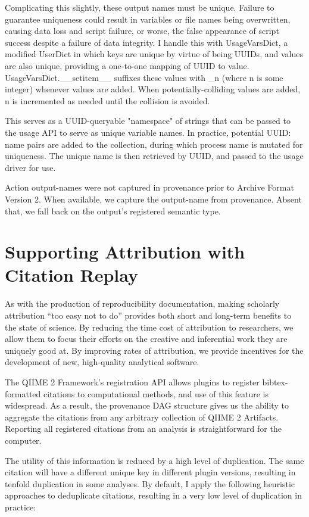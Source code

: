 Complicating this slightly, these output names must be unique. Failure to
guarantee uniqueness could result in variables or file names being overwritten,
causing data loss and script failure, or worse, the false appearance of script
success despite a failure of data integrity. I handle this with UsageVarsDict, a
modified UserDict in which keys are unique by virtue of being UUIDs, and values
are also unique, providing a one-to-one mapping of UUID to value.
UsageVarsDict.\_\_setitem\_\_ suffixes these values with \_n (where n is some
integer) whenever values are added. When potentially-colliding values are added,
n is incremented as needed until the collision is avoided. 

This serves as a UUID-queryable "namespace" of strings that can be passed to the
usage API to serve as unique variable names. In practice, potential {UUID: name}
pairs are added to the collection, during which process name is mutated for
uniqueness. The unique name is then retrieved by UUID, and passed to the usage
driver for use.

Action output-names were not captured in provenance prior to Archive Format
Version 2. When available, we capture the output-name from provenance. Absent
that, we fall back on the output’s registered semantic type.


\section{Supporting Attribution with Citation Replay}

As with the production of reproducibility documentation, making scholarly
attribution “too easy not to do” provides both short and long-term benefits to
the state of science. By reducing the time cost of attribution to researchers,
we allow them to focus their efforts on the creative and inferential work they
are uniquely good at. By improving rates of attribution, we provide incentives
for the development of new, high-quality analytical software. 

The QIIME 2 Framework’s registration API allows plugins to register
bibtex-formatted citations to computational methods, and use of this feature is
widespread. As a result, the provenance DAG structure gives us the ability to
aggregate the citations from any arbitrary collection of QIIME 2 Artifacts.
Reporting all registered citations from an analysis is straightforward for the
computer.

The utility of this information is reduced by a high level of duplication. The
same citation will have a different unique key in different plugin versions,
resulting in tenfold duplication in some analyses. By default, I apply the
following heuristic approaches to deduplicate citations, resulting in a very low
level of duplication in practice:

